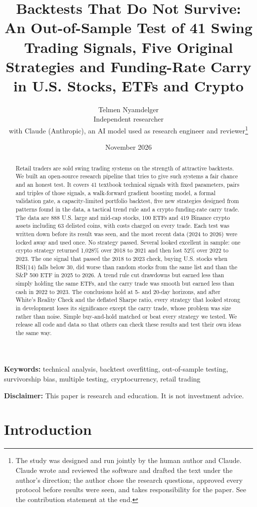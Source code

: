 \documentclass[11pt]{article}
\title{Backtests That Do Not Survive: An Out-of-Sample Test of 41 Swing Trading Signals, Five Original Strategies and Funding-Rate Carry in U.S. Stocks, ETFs and Crypto}
\author{Telmen Nyamdelger\\[2pt]
\small Independent researcher\\[6pt]
\small with Claude (Anthropic), an AI model used as research engineer and reviewer\thanks{%
The study was designed and run jointly by the human author and Claude. Claude wrote and reviewed
the software and drafted the text under the author's direction; the author chose the research
questions, approved every protocol before results were seen, and takes responsibility for the
paper. See the contribution statement at the end.}}
\date{November 2026}
\begin{document}
\maketitle

\begin{abstract}
Retail traders are sold swing trading systems on the strength of attractive backtests. We built an
open-source research pipeline that tries to give such systems a fair chance and an honest test.
It covers 41 textbook technical signals with fixed parameters, pairs and triples of those signals,
a walk-forward gradient boosting model, a formal validation gate, a capacity-limited portfolio
backtest, five new strategies designed from patterns found in the data, a tactical trend rule and a
crypto funding-rate carry trade. The data are 888 U.S. large and mid-cap stocks, 100 ETFs and 419
Binance crypto assets including 63 delisted coins, with costs charged on every trade. Each test was
written down before its result was seen, and the most recent data (2024 to 2026) were locked away
and used once.
No strategy passed. Several looked excellent in sample: one crypto strategy returned 1,028\% over
2018 to 2021 and then lost 52\% over 2022 to 2023. The one signal that passed the 2018 to 2023
check, buying U.S. stocks when RSI(14) falls below 30, did worse than random stocks from the same
list and than the S\&P 500 ETF in 2025 to 2026. A trend rule cut drawdowns but earned less than
simply holding the same ETFs, and the carry trade was smooth but earned less than cash in 2022 to
2023. The conclusions hold at 5- and 20-day horizons, and after White's Reality Check and the
deflated Sharpe ratio, every strategy that looked strong in development loses its significance except
the carry trade, whose problem was size rather than noise. Simple buy-and-hold matched or beat every
strategy we tested. We release all code and data so that others can check these results and test
their own ideas the same way.
\end{abstract}

\noindent\textbf{Keywords:} technical analysis, backtest overfitting, out-of-sample testing,
survivorship bias, multiple testing, cryptocurrency, retail trading

\noindent\textbf{Disclaimer:} This paper is research and education. It is not investment advice.

\section{Introduction}
\end{document}
